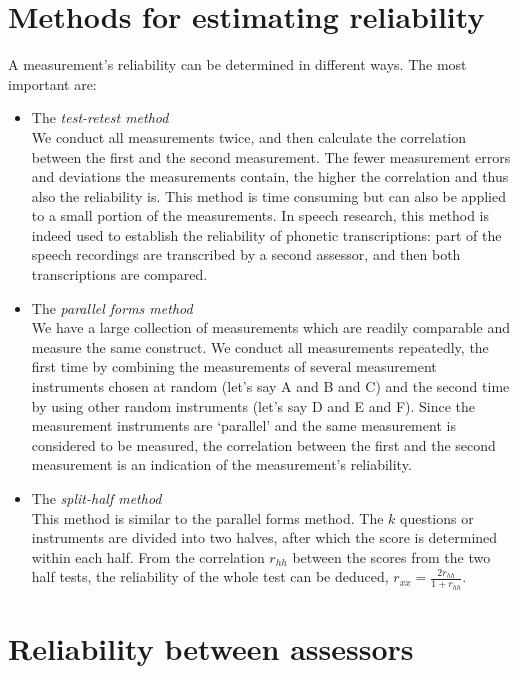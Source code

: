 \documentclass[
]{book}
\begin{document}
\section{Methods for estimating reliability}\label{methods-for-estimating-reliability}

A measurement's reliability can be determined in different ways.
The most important are:

\begin{itemize}
\item
  The \emph{test-retest method}\\
  We conduct all measurements twice, and then calculate the correlation
  between the first and the second measurement. The fewer measurement errors
  and deviations the measurements contain, the higher the correlation
  and thus also the reliability is. This method is
  time consuming but can also be applied to a small portion of the
  measurements. In speech research, this method is indeed used to establish
  the reliability of phonetic transcriptions: part of the speech
  recordings are transcribed by a second assessor, and then both transcriptions
  are compared.
\item
  The \emph{parallel forms method}\\
  We have a large collection of measurements which are readily
  comparable and measure the same construct. We conduct all
  measurements repeatedly, the first time by combining the measurements
  of several measurement instruments chosen at random (let's say A
  and B and C) and the second time by using other random
  instruments (let's say D and E and F). Since the measurement instruments are
  `parallel' and the same measurement is considered to be measured, the correlation
  between the first and the second measurement is an indication of the
  measurement's reliability.
\item
  The \emph{split-half method}\\
  This method is similar to the parallel forms method. The \(k\) questions
  or instruments are divided into two halves, after which the score
  is determined within each half. From the correlation \(r_{hh}\) between
  the scores from the two half tests, the reliability of the whole test can
  be deduced, \(r_{xx} = \frac{2r_{hh}}{1+r_{hh}}\).
\end{itemize}

\section{Reliability between assessors}\label{reliability-between-assessors}
\end{document}

